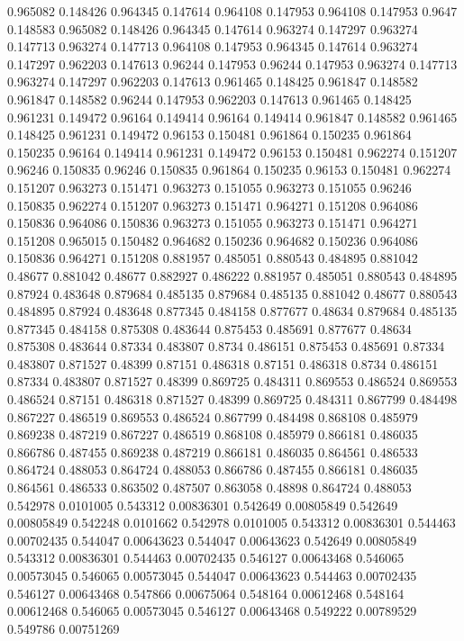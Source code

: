 0.965082 0.148426
0.964345 0.147614
0.964108 0.147953
0.964108 0.147953
0.9647 0.148583
0.965082 0.148426
0.964345 0.147614
0.963274 0.147297
0.963274 0.147713
0.963274 0.147713
0.964108 0.147953
0.964345 0.147614
0.963274 0.147297
0.962203 0.147613
0.96244 0.147953
0.96244 0.147953
0.963274 0.147713
0.963274 0.147297
0.962203 0.147613
0.961465 0.148425
0.961847 0.148582
0.961847 0.148582
0.96244 0.147953
0.962203 0.147613
0.961465 0.148425
0.961231 0.149472
0.96164 0.149414
0.96164 0.149414
0.961847 0.148582
0.961465 0.148425
0.961231 0.149472
0.96153 0.150481
0.961864 0.150235
0.961864 0.150235
0.96164 0.149414
0.961231 0.149472
0.96153 0.150481
0.962274 0.151207
0.96246 0.150835
0.96246 0.150835
0.961864 0.150235
0.96153 0.150481
0.962274 0.151207
0.963273 0.151471
0.963273 0.151055
0.963273 0.151055
0.96246 0.150835
0.962274 0.151207
0.963273 0.151471
0.964271 0.151208
0.964086 0.150836
0.964086 0.150836
0.963273 0.151055
0.963273 0.151471
0.964271 0.151208
0.965015 0.150482
0.964682 0.150236
0.964682 0.150236
0.964086 0.150836
0.964271 0.151208
0.881957 0.485051
0.880543 0.484895
0.881042 0.48677
0.881042 0.48677
0.882927 0.486222
0.881957 0.485051
0.880543 0.484895
0.87924 0.483648
0.879684 0.485135
0.879684 0.485135
0.881042 0.48677
0.880543 0.484895
0.87924 0.483648
0.877345 0.484158
0.877677 0.48634
0.879684 0.485135
0.877345 0.484158
0.875308 0.483644
0.875453 0.485691
0.877677 0.48634
0.875308 0.483644
0.87334 0.483807
0.8734 0.486151
0.875453 0.485691
0.87334 0.483807
0.871527 0.48399
0.87151 0.486318
0.87151 0.486318
0.8734 0.486151
0.87334 0.483807
0.871527 0.48399
0.869725 0.484311
0.869553 0.486524
0.869553 0.486524
0.87151 0.486318
0.871527 0.48399
0.869725 0.484311
0.867799 0.484498
0.867227 0.486519
0.869553 0.486524
0.867799 0.484498
0.868108 0.485979
0.869238 0.487219
0.867227 0.486519
0.868108 0.485979
0.866181 0.486035
0.866786 0.487455
0.869238 0.487219
0.866181 0.486035
0.864561 0.486533
0.864724 0.488053
0.864724 0.488053
0.866786 0.487455
0.866181 0.486035
0.864561 0.486533
0.863502 0.487507
0.863058 0.48898
0.864724 0.488053
0.542978 0.0101005
0.543312 0.00836301
0.542649 0.00805849
0.542649 0.00805849
0.542248 0.0101662
0.542978 0.0101005
0.543312 0.00836301
0.544463 0.00702435
0.544047 0.00643623
0.544047 0.00643623
0.542649 0.00805849
0.543312 0.00836301
0.544463 0.00702435
0.546127 0.00643468
0.546065 0.00573045
0.546065 0.00573045
0.544047 0.00643623
0.544463 0.00702435
0.546127 0.00643468
0.547866 0.00675064
0.548164 0.00612468
0.548164 0.00612468
0.546065 0.00573045
0.546127 0.00643468
0.549222 0.00789529
0.549786 0.00751269
